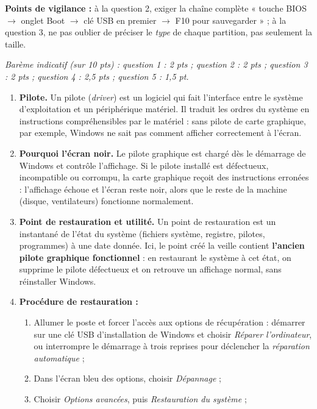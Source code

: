 \documentclass[11pt]{article}
\begin{document}
\begin{corrige}
\begin{enumerate}
\end{enumerate}
\textbf{Points de vigilance :} à la question 2, exiger la chaîne complète « touche BIOS $\rightarrow$ onglet Boot $\rightarrow$ clé USB en premier $\rightarrow$ F10 pour sauvegarder » ; à la question 3, ne pas oublier de préciser le \emph{type} de chaque partition, pas seulement la taille.
\end{corrige}

\begin{corrige}
\emph{Barème indicatif (sur 10 pts) : question 1 : 2 pts ; question 2 : 2 pts ; question 3 : 2 pts ; question 4 : 2,5 pts ; question 5 : 1,5 pt.}
\begin{enumerate}
\item \textbf{Pilote.} Un pilote (\emph{driver}) est un logiciel qui fait l'interface entre le système d'exploitation et un périphérique matériel. Il traduit les ordres du système en instructions compréhensibles par le matériel : sans pilote de carte graphique, par exemple, Windows ne sait pas comment afficher correctement à l'écran.
\item \textbf{Pourquoi l'écran noir.} Le pilote graphique est chargé dès le démarrage de Windows et contrôle l'affichage. Si le pilote installé est défectueux, incompatible ou corrompu, la carte graphique reçoit des instructions erronées : l'affichage échoue et l'écran reste noir, alors que le reste de la machine (disque, ventilateurs) fonctionne normalement.
\item \textbf{Point de restauration et utilité.} Un point de restauration est un instantané de l'état du système (fichiers système, registre, pilotes, programmes) à une date donnée. Ici, le point créé la veille contient \textbf{l'ancien pilote graphique fonctionnel} : en restaurant le système à cet état, on supprime le pilote défectueux et on retrouve un affichage normal, sans réinstaller Windows.
\item \textbf{Procédure de restauration :}
\begin{enumerate}
\item Allumer le poste et forcer l'accès aux options de récupération : démarrer sur une clé USB d'installation de Windows et choisir \emph{Réparer l'ordinateur}, ou interrompre le démarrage à trois reprises pour déclencher la \emph{réparation automatique} ;
\item Dans l'écran bleu des options, choisir \emph{Dépannage} ;
\item Choisir \emph{Options avancées}, puis \emph{Restauration du système} ;

\end{enumerate}
\end{enumerate}
\end{corrige}
\end{document}
